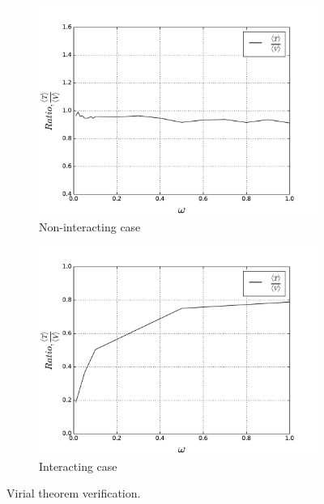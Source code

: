 \documentclass[10pt]{article}
\begin{document}
\begin{figure}[h!] 
  \begin{subfigure}[b]{0.6\linewidth}
    \centering
    \includegraphics[width=1.1\linewidth]{Ratio_non_ineracting} 
    \caption{Non-interacting case} 
    \label{fig2:a} 
    \vspace{1ex}
  \end{subfigure}%
  \begin{subfigure}[b]{0.6\linewidth}
    \centering
    \includegraphics[width=1.1\linewidth]{ratio_on_omega_ineraction} 
    \caption{Interacting case} 
    \label{fig2:b} 
    \vspace{1ex}
  \end{subfigure} 
  \caption{Virial theorem verification.}
  \label{fig2} 
\end{figure}
\end{document}
